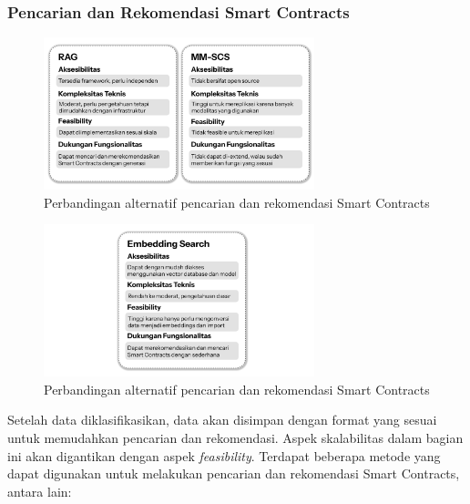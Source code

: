 \subsubsection{Pencarian dan Rekomendasi Smart Contracts}

\begin{figure}[ht]
	\centering
	\includegraphics[width=0.7\textwidth]{resources/chapter-3/pencarian-1.png}
    \caption{Perbandingan alternatif pencarian dan rekomendasi Smart Contracts}
    \label{image:pencarian-1}
\end{figure}

\begin{figure}[ht]
	\centering
	\includegraphics[width=0.7\textwidth]{resources/chapter-3/pencarian-2.png}
    \caption{Perbandingan alternatif pencarian dan rekomendasi Smart Contracts}
    \label{image:pencarian-2}
\end{figure}

Setelah data diklasifikasikan, data akan disimpan dengan format yang sesuai untuk memudahkan pencarian dan rekomendasi. Aspek skalabilitas dalam bagian ini akan digantikan dengan aspek \textit{feasibility}. Terdapat beberapa metode yang dapat digunakan untuk melakukan pencarian dan rekomendasi Smart Contracts, antara lain:

